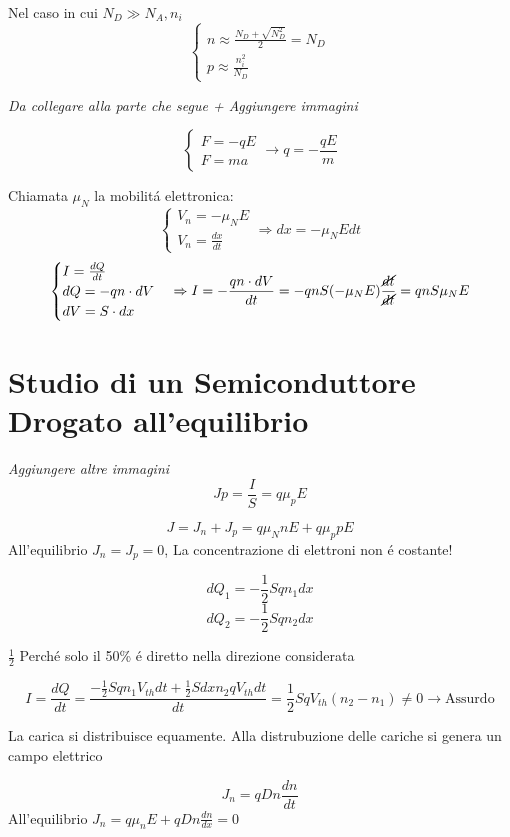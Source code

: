 \documentclass{article}
\begin{document}
Nel caso in cui $N_D \gg N_A, n_i$
\[
    \begin{cases}
        n \approx \frac{N_D + \sqrt{N_D^2}}{2} = N_D\\
        p \approx \frac{n_i^2}{N_D}
    \end{cases}
\]

\textit{Da collegare alla parte che segue + Aggiungere immagini}

\[
    \begin{cases}
        F = -qE\\
        F = ma
    \end{cases} \rightarrow q = -\frac{qE}{m}
\]

Chiamata $\mu_N$ la mobilit\'a elettronica:
\[
    \begin{cases}
        V_n = -\mu_N E\\
        V_n = \frac{dx}{dt}
    \end{cases} \Rightarrow dx = -\mu_N E dt
\]
\[
    \begin{cases}
        I = \frac{dQ}{dt} \\
        dQ = -qn\cdot dV\\
        dV = S\cdot dx
    \end{cases} \Rightarrow I = -\frac{qn\cdot dV}{dt} = -qnS(-\mu_N E) \frac{\cancel{dt}}{\cancel{dt}} = qnS\mu_N E
\]

\section{Studio di un Semiconduttore Drogato all'equilibrio}
\textit{Aggiungere altre immagini}
\[ Jp = \frac{I}{S} = q\mu_p E \]


\[ J = J_n + J_p = q\mu_N n E + q \mu_p p E\]
All'equilibrio $J_n = J_p = 0$, La concentrazione di elettroni non \'e costante!

\[ dQ_1 = -\frac{1}{2} S q n_1 dx \]
\[ dQ_2 = -\frac{1}{2} S q n_2 dx \]

$\frac{1}{2}$  Perch\'e solo il 50\% \'e diretto nella direzione considerata

\[ I = \frac{dQ}{dt} = \frac{-\frac{1}{2}Sqn_1V_{th}dt + \frac{1}{2}Sdxn_2qV_{th}dt}{dt}  = \frac{1}{2} SqV_{th}(n_2- n_1) \neq 0 \rightarrow\text{Assurdo}\]

La carica si distribuisce equamente. Alla distrubuzione delle cariche si genera un campo elettrico

\[ J_n= qDn\frac{dn}{dt} \]
All'equilibrio $J_n = q \mu_n E + qDn\frac{dn}{dx} = 0$
\end{document}
